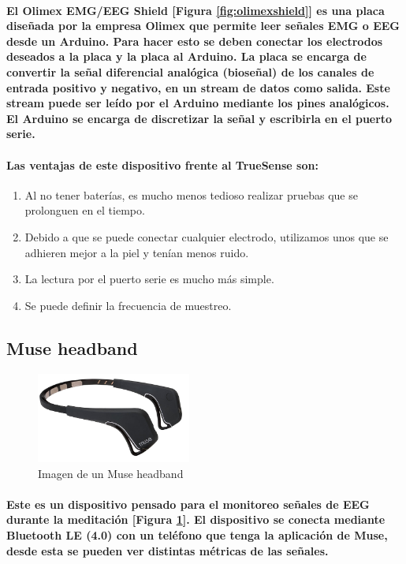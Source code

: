 \documentclass{article}
\begin{document}
\paragraph{
El Olimex EMG/EEG Shield [Figura \ref{fig:olimexshield}] es una placa diseñada por la empresa Olimex que permite leer señales EMG o EEG desde un Arduino. Para hacer esto se deben conectar los electrodos deseados a la placa y la placa al Arduino. La placa se encarga de convertir la señal diferencial analógica (bioseñal) de los canales de entrada positivo y negativo, en un stream de datos como salida. Este stream puede ser leído por el Arduino mediante los pines analógicos. El Arduino se encarga de discretizar la señal y escribirla en el puerto serie.
}

\paragraph{
Las ventajas de este dispositivo frente al TrueSense son:
}

\begin{enumerate}
  \item Al no tener baterías, es mucho menos tedioso realizar pruebas que se prolonguen en el tiempo.
  \item Debido a que se puede conectar cualquier electrodo, utilizamos unos que se adhieren mejor a la piel y tenían menos ruido.
  \item La lectura por el puerto serie es mucho más simple.
  \item Se puede definir la frecuencia de muestreo.
\end{enumerate}

\subsection{Muse headband}
\begin{figure}[ht]
    \centering
    \includegraphics[width=2in]{museheadband.jpg}%
    \caption{Imagen de un Muse headband}
    \label{fig:muse}
\end{figure}
\paragraph{
Este es un dispositivo pensado para el monitoreo señales de EEG durante la meditación [Figura \ref{fig:muse}]. El dispositivo se conecta mediante Bluetooth LE (4.0) con un teléfono que tenga la aplicación de Muse, desde esta se pueden ver distintas métricas de las señales.
}
\end{document}
